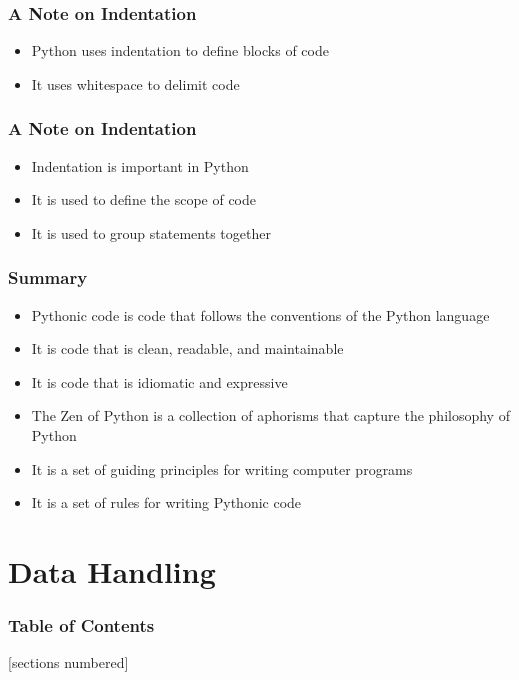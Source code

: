 \documentclass[serif, 9pt, aspectratio=32]{beamer}
\begin{document}
\begin{frame}
    \centering
    \frametitle{A Note on Indentation}
    \begin{itemize}
        \setlength{\itemsep}{2em}
        \item Python uses indentation to define blocks of code
        \item It uses whitespace to delimit code
    \end{itemize}
\end{frame}

\begin{frame}
    \centering
    \frametitle{A Note on Indentation}
    \begin{itemize}
        \setlength{\itemsep}{2em}
        \item Indentation is important in Python
        \item It is used to define the scope of code
        \item It is used to group statements together
    \end{itemize}
\end{frame}

\begin{frame}
    \centering
    \frametitle{Summary}
    \begin{itemize}
        \setlength{\itemsep}{2em}
        \item Pythonic code is code that follows the conventions of the Python language
        \item It is code that is clean, readable, and maintainable
        \item It is code that is idiomatic and expressive
        \item The Zen of Python is a collection of aphorisms that capture the philosophy of Python
        \item It is a set of guiding principles for writing computer programs
        \item It is a set of rules for writing Pythonic code
    \end{itemize}
\end{frame}

\section{Data Handling}

\begin{frame}
    \frametitle{Table of Contents}
    [sections numbered]
    \tableofcontents[currentsection]
\end{frame}
\end{document}

